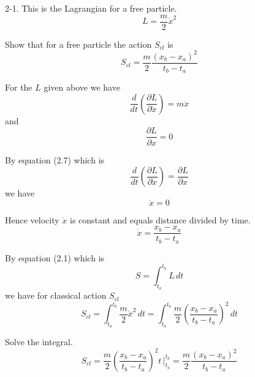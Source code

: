 \documentclass[12pt]{article}
\begin{document}
2-1.
This is the Lagrangian for a free particle.
\begin{equation*}
L=\frac{m}{2}\dot x^2
\end{equation*}

Show that for a free particle the action $S_{cl}$ is
\begin{equation*}
S_{cl}=\frac{m}{2}\frac{(x_b-x_a)^2}{t_b-t_a}
\end{equation*}

For the $L$ given above we have
\begin{equation*}
\frac{d}{dt}\left(\frac{\partial L}{\partial\dot x}\right)=m\ddot x
\end{equation*}
and
\begin{equation*}
\frac{\partial L}{\partial x}=0
\end{equation*}

By equation (2.7) which is
\begin{equation*}
\frac{d}{dt}\left(\frac{\partial L}{\partial\dot x}\right)=\frac{\partial L}{\partial x}
\end{equation*}
we have
\begin{equation*}
\ddot x=0
\end{equation*}

Hence velocity $\dot x$ is constant and equals distance divided by time.
\begin{equation*}
\dot x=\frac{x_b-x_a}{t_b-t_a}
\end{equation*}

By equation (2.1) which is
\begin{equation*}
S=\int_{t_a}^{t_b} L\,dt
\end{equation*}
we have for classical action $S_{cl}$
\begin{equation*}
S_{cl}=\int_{t_a}^{t_b}\frac{m}{2}\dot x^2\,dt=\int_{t_a}^{t_b}\frac{m}{2}\left(\frac{x_b-x_a}{t_b-t_a}\right)^2\,dt
\end{equation*}

Solve the integral.
\begin{equation*}
S_{cl}
=\frac{m}{2}\left(\frac{x_b-x_a}{t_b-t_a}\right)^2 t\,\bigg|_{t_a}^{t_b}
=\frac{m}{2}\frac{(x_b-x_a)^2}{t_b-t_a}
\end{equation*}
\end{document}
